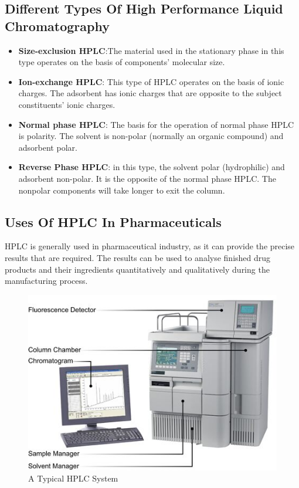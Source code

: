 \documentclass{article}
\begin{document}
\subsection{Different Types Of High Performance Liquid Chromatography}
\begin{itemize}
\item  \textbf{Size-exclusion HPLC}:The material used in the stationary phase in this type operates on the basis of components' molecular size.
\item \textbf{Ion-exchange HPLC}: This type of HPLC operates on the basis of ionic charges. The adsorbent has ionic charges that are opposite to the subject constituents' ionic charges.
\item \textbf{Normal phase HPLC}: The basis for the operation of normal phase HPLC is polarity. The solvent is non-polar (normally an organic compound) and adsorbent polar.
\item \textbf{Reverse Phase HPLC}: in this type, the solvent polar (hydrophilic) and adsorbent non-polar. It is the opposite of the normal phase HPLC. The nonpolar components will take longer to exit the column.
\end{itemize}
\subsection{Uses Of HPLC In Pharmaceuticals}
HPLC is generally used in pharmaceutical industry, as it can provide the precise results that are required. The results can be used to analyse finished drug products and their ingredients quantitatively and qualitatively during the manufacturing process.
\begin{figure} [h]
    \centering
    \includegraphics[scale=0.7]{primer_F_AllianceHPLCSystem.jpg}
    \caption{A Typical HPLC System}
    \label{fig:a typical hplc system}
\end{figure}
\pagebreak
\end{document}
